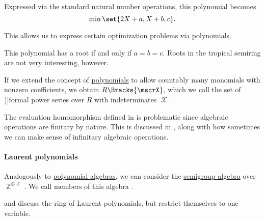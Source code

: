 \begin{example}
\begin{thmenum}
    Expressed via the standard natural number operations, this polynomial becomes
    \begin{equation*}
      \min\set{ 2X + a, X + b, c }.
    \end{equation*}

    This allows us to express certain optimization problems via polynomials.

    This polynomial has a root if and only if \( a = b = c \). Roots in the tropical semiring are not very interesting, however.
  \end{thmenum}
\end{example}

\begin{definition}\label{def:formal_power_series}
  If we extend the concept of \hyperref[def:polynomial_algebra]{polynomials} to allow countably many monomials with nonzero coefficients, we obtain \( R\Bracks{\mscrX} \), which we call the set of \term[ru=формальные степянные ряды (\cite[28]{Шафаревич1999ОсновныеПонятияАлгебры})]{formal power series} over \( R \) with indeterminates \( \mscrX \).
\end{definition}
\begin{comments}
  \item The evaluation homomorphism defined in  is problematic since algebraic operations are finitary by nature. This is discussed in , along with how sometimes we can make sense of infinitary algebraic operations.
\end{comments}

\paragraph{Laurent polynomials}

\begin{definition}\label{def:laurent_polynomial_algebra}\mimprovised
  Analogously to \hyperref[def:polynomial_algebra]{polynomial algebras}, we can consider the \hyperref[def:semigroup_algebra]{semigroup algebra} over \( \BbbZ^{\oplus \mscrX} \). We call members of this algebra .
\end{definition}
\begin{comments}
  \item {} and  discuss the ring of Laurent polynomials, but restrict themselves to one variable.
\end{comments}

